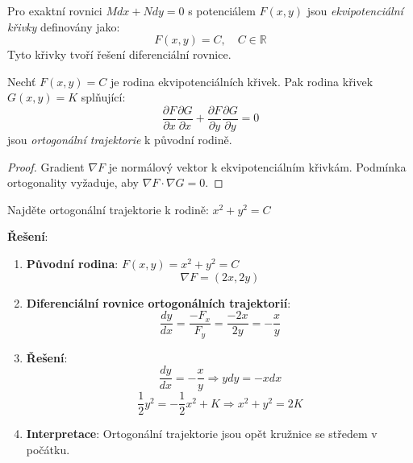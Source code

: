 \begin{definition}
Pro exaktní rovnici $M dx + N dy = 0$ s potenciálem $F(x, y)$ jsou \emph{ekvipotenciální křivky} definovány jako:
\[
F(x, y) = C, \quad C \in \mathbb{R}
\]
Tyto křivky tvoří řešení diferenciální rovnice.
\end{definition}

\vspace{0.6\baselineskip}

\begin{theorem}
Nechť $F(x, y) = C$ je rodina ekvipotenciálních křivek. Pak rodina křivek $G(x, y) = K$ splňující:
\[
\frac{\partial F}{\partial x} \frac{\partial G}{\partial x} + \frac{\partial F}{\partial y} \frac{\partial G}{\partial y} = 0
\]
jsou \emph{ortogonální trajektorie} k původní rodině.
\end{theorem}

\vspace{0.4\baselineskip}

\begin{proof}
Gradient $\nabla F$ je normálový vektor k ekvipotenciálním křivkám. Podmínka ortogonality vyžaduje, aby $\nabla F \cdot \nabla G = 0$.
\end{proof}

\vspace{0.6\baselineskip}

\begin{example}
Najděte ortogonální trajektorie k rodině: $x^2 + y^2 = C$
\vspace{0.3\baselineskip}

\textbf{Řešení}:
\begin{enumerate}
\item \textbf{Původní rodina}: $F(x, y) = x^2 + y^2 = C$
\[
\nabla F = (2x, 2y)
\]

\item \textbf{Diferenciální rovnice ortogonálních trajektorií}:
\[
\frac{dy}{dx} = \frac{-F_x}{F_y} = \frac{-2x}{2y} = -\frac{x}{y}
\]

\item \textbf{Řešení}:
\[
\frac{dy}{dx} = -\frac{x}{y} \Rightarrow y dy = -x dx
\]
\[
\frac{1}{2}y^2 = -\frac{1}{2}x^2 + K \Rightarrow x^2 + y^2 = 2K
\]

\item \textbf{Interpretace}: Ortogonální trajektorie jsou opět kružnice se středem v počátku.
\end{enumerate}
\end{example}

